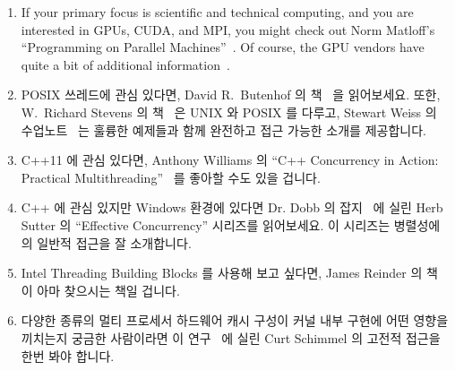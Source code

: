 \begin{enumerate}
\item	If your primary focus is scientific and technical computing,
	and you are interested in GPUs, CUDA, and MPI, you
	might check out Norm Matloff's ``Programming on
	Parallel Machines''~\cite{NormMatloff2013ParProcBook}.
	Of course, the GPU vendors have quite a bit of additional
	information~\cite{AMD2017OpenCL,CyrilZeller2011GPGPUbasics,NVidia2017GPGPU,NVidia2017GPGPU-university}.
\fi
\item	POSIX 쓰레드에 관심 있다면, David R.~Butenhof 의
	책~\cite{Butenhof1997pthreads} 을 읽어보세요.
	또한, W.~Richard Stevens 의 책~\cite{WRichardStevens1992} 은 UNIX 와
	POSIX 를 다루고, Stewart Weiss 의 수업노트~\cite{StewartWeiss2013UNIX}
	는 훌륭한 예제들과 함께 완전하고 접근 가능한 소개를 제공합니다.
\iffalse

\item	If you are interested in POSIX Threads, you might take
	a look at David R.~Butenhof's book~\cite{Butenhof1997pthreads}.
	In addition,
	W.~Richard Stevens's book~\cite{WRichardStevens1992}
	covers UNIX and POSIX, and Stewart Weiss's lecture
	notes~\cite{StewartWeiss2013UNIX} provide an
	thorough and accessible introduction with a good set of
	examples.
\fi
\item	C++11 에 관심 있다면, Anthony Williams 의 ``C++ Concurrency in Action:
	Practical Multithreading''~\cite{AnthonyWilliams2012} 를 좋아할 수도
	있을 겁니다.
\iffalse

\item	If you are interested in C++11, you might like
	Anthony Williams's ``C++ Concurrency in Action: Practical
	Multithreading''~\cite{AnthonyWilliams2012}.
\fi
\item	C++ 에 관심 있지만 Windows 환경에 있다면 Dr. Dobb 의
	잡지~\cite{HerbSutter2008EffectiveConcurrency} 에 실린 Herb Sutter 의
	``Effective Concurrency'' 시리즈를 읽어보세요.
	이 시리즈는 병렬성에의 일반적 접근을 잘 소개합니다.
\iffalse

\item	If you are interested in C++, but in a Windows environment,
	you might try Herb Sutter's ``Effective Concurrency''
	series in
	Dr. Dobbs Journal~\cite{HerbSutter2008EffectiveConcurrency}.
	This series does a reasonable job of presenting a
	commonsense approach to parallelism.
\fi
\item	Intel Threading Building Blocks 를 사용해 보고 싶다면, James Reinder 의
	책~\cite{Reinders2007Textbook} 이 아마 찾으시는 책일 겁니다.
\iffalse

\item	If you want to try out Intel Threading Building Blocks,
	then perhaps James Reinders's book~\cite{Reinders2007Textbook}
	is what you are looking for.
\fi
\item	다양한 종류의 멀티 프로세서 하드웨어 캐시 구성이 커널 내부 구현에 어떤
	영향을 끼치는지 궁금한 사람이라면 이
	연구~\cite{Schimmel:1994:USM:175689} 에 실린 Curt Schimmel 의 고전적
	접근을 한번 봐야 합니다.
\iffalse


\end{enumerate}
